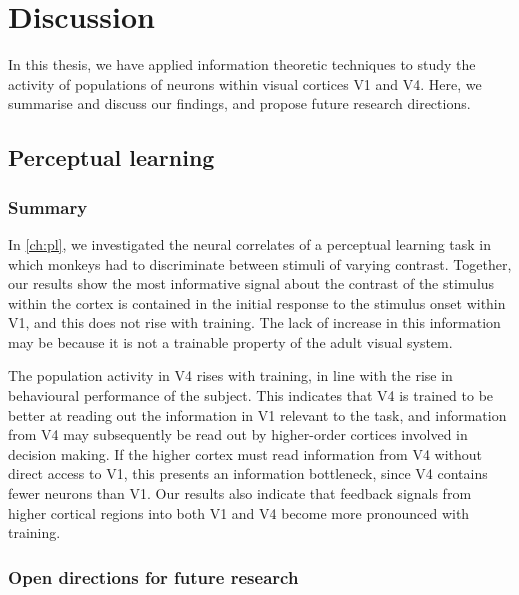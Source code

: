 

\chapter{Discussion}
\label{ch:discussion}

In this thesis, we have applied information theoretic techniques to study the activity of populations of neurons within visual cortices \ac{V1} and \ac{V4}.
Here, we summarise and discuss our findings, and propose future research directions.


\section{Perceptual learning}

\subsection{Summary}

In \autoref{ch:pl}, we investigated the neural correlates of a perceptual learning task in which monkeys had to discriminate between stimuli of varying contrast.
Together, our results show the most informative signal about the contrast of the stimulus within the cortex is contained in the initial response to the stimulus onset within \ac{V1}, and this does not rise with training.
The lack of increase in this information may be because it is not a trainable property of the adult visual system.

The population activity in \ac{V4} rises with training, in line with the rise in behavioural performance of the subject.
This indicates that \ac{V4} is trained to be better at reading out the information in \ac{V1} relevant to the task, and information from \ac{V4} may subsequently be read out by higher-order cortices involved in decision making.
If the higher cortex must read information from \ac{V4} without direct access to \ac{V1}, this presents an information bottleneck, since \ac{V4} contains fewer neurons than \ac{V1}.
Our results also indicate that feedback signals from higher cortical regions into both \ac{V1} and \ac{V4} become more pronounced with training.


\subsection{Open directions for future research}

